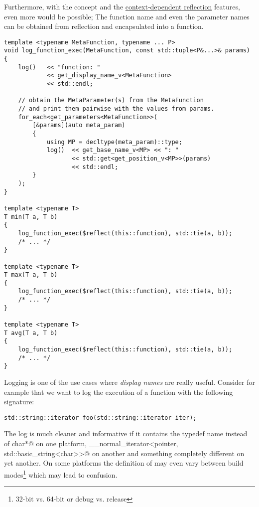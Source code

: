 Furthermore, with the  concept and the
\hyperref[context-dependent-reflection]{context-dependent reflection} features,
even more would be possible; The function name and even the parameter names can
be obtained from reflection and encapsulated into a function.

\begin{verbatim}
template <typename MetaFunction, typename ... P>
void log_function_exec(MetaFunction, const std::tuple<P&...>& params)
{
	log()   << "function: "
	        << get_display_name_v<MetaFunction>
	        << std::endl;

	// obtain the MetaParameter(s) from the MetaFunction
	// and print them pairwise with the values from params.
	for_each<get_parameters<MetaFunction>>(
		[&params](auto meta_param)
		{
			using MP = decltype(meta_param)::type;
			log()  << get_base_name_v<MP> << ": "
			       << std::get<get_position_v<MP>>(params)
			       << std::endl;
		}
	);
}

template <typename T>
T min(T a, T b)
{
	log_function_exec($reflect(this::function), std::tie(a, b));
	/* ... */
}

template <typename T>
T max(T a, T b)
{
	log_function_exec($reflect(this::function), std::tie(a, b));
	/* ... */
}

template <typename T>
T avg(T a, T b)
{
	log_function_exec($reflect(this::function), std::tie(a, b));
	/* ... */
}
\end{verbatim}

Logging is one of the use cases where {\em display names} are really useful.
Consider for example that we want to log the execution of a function with
the following signature:

\begin{verbatim}
std::string::iterator foo(std::string::iterator iter);
\end{verbatim}

The log is much cleaner and informative if it contains the typedef name
\verb@iterator@ instead of \verb@const char*@ on one platform,
\verb@__normal_iterator<pointer, std::basic_string<char>>@ on another and
something completely different on yet another. On some platforms the definition
of \verb@iterator@ may even vary between build modes\footnote{32-bit vs. 64-bit or 
debug vs. release} which may lead to confusion.
